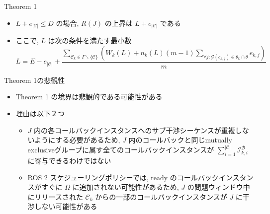 \begin{frame}{}
\end{frame}

\begin{frame}[label=theorem1]{Theorem 1}
    \begin{theorem}[]
        \setlength{\linewidth}{0.98\columnwidth}
        \begin{itemize}
            \item $L+e_{|\mathcal{C}|} \leq D$ の場合, $R(J)$ の上界は $L+e_{|\mathcal{C}|}$ である
            \item ここで, $L$ は次の条件を満たす最小数
                  \begin{equation*}
                      L=E-e_{|\mathcal{C}|}+\frac{\sum_{\mathcal{C}_{k} \in \Gamma \backslash\{\mathcal{C}\}}\left(W_{k}(L)+n_{k}(L)(m-1) \sum_{\forall j: \mathcal{G}\left(c_{k, j}\right) \in \theta_{k} \cap \theta} e_{k, j}\right)}{m}
                  \end{equation*}
        \end{itemize}
    \end{theorem}
\end{frame}


\begin{frame}{Theorem 1の悲観性}
    \begin{itemize}
        \item Theorem 1 の境界は悲観的である可能性がある
        \item 理由は以下２つ
        \begin{itemize}
            \item $J$ 内の各コールバックインスタンスへのサブ干渉シーケンスが重複しないようにする必要があるため, $J$ 内のコールバックと同じmutually exclusiveグループに属す全てのコールバックインスタンスが $\sum_{i=1}^{|\mathcal{C}|} \mathcal{I}_{k, i}^{\mathcal{B}}$ に寄与できるわけではない
            \item ROS 2 スケジューリングポリシーでは, ready のコールバックインスタンスがすぐに $\Omega$ に追加されない可能性があるため, $J$ の問題ウィンドウ中にリリースされた $\mathcal{C}_{k}$ からの一部のコールバックインスタンスが $J$ に干渉しない可能性がある
        \end{itemize}
    \end{itemize}
\end{frame}

